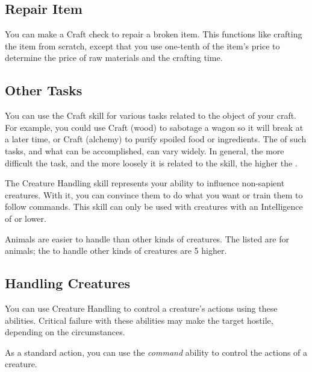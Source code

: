     \subsection{Repair Item}
        You can make a Craft check to repair a broken item. This functions like crafting the item from scratch, except that you use one-tenth of the item's price to determine the price of raw materials and the crafting time.

    \subsection{Other Tasks}
        You can use the Craft skill for various tasks related to the object of your craft. For example, you could use Craft (wood) to sabotage a wagon so it will break at a later time, or Craft (alchemy) to purify spoiled food or ingredients. The  of such tasks, and what can be accomplished, can vary widely. In general, the more difficult the task, and the more loosely it is related to the skill, the higher the .

\newpage
{}
    The Creature Handling skill represents your ability to influence non-sapient creatures.
    With it, you can convince them to do what you want or train them to follow commands. This skill can only be used with creatures with an Intelligence of  or lower.

        Animals are easier to handle than other kinds of creatures.
        The  listed are for animals; the  to handle other kinds of creatures are 5 higher.

    \subsection{Handling Creatures}
        You can use Creature Handling to control a creature's actions using these abilities.
        Critical failure with these abilities may make the target hostile, depending on the circumstances.

        As a standard action, you can use the \textit{command} ability to control the actions of a creature.

